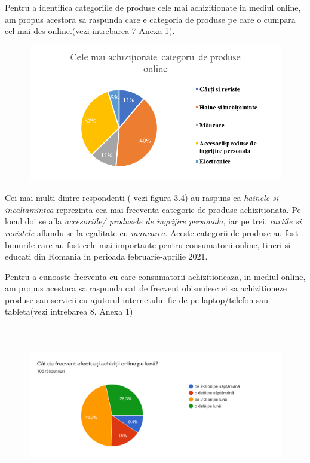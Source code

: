 \documentclass[a4paper, 12pt]{article}
\begin{document}
\begin{enumerate}[(A)]
		\quad Pentru a identifica categoriile de produse cele mai achizitionate in mediul online, am propus acestora sa raspunda care e categoria de produse pe care o cumpara cel mai des online.(vezi intrebarea 7 Anexa 1).
		
		\begin{figure}[!htb]
			\centering
			\includegraphics[width=13cm, height=6cm]{"figures/patru.png"}
		\end{figure}
	
		\quad Cei mai multi dintre respondenti ( vezi figura 3.4) au raspuns ca\textit{ hainele si incaltamintea} reprezinta cea mai frecventa categorie de produse achizitionata. Pe locul doi se afla \textit{accesoriile/ produsele de ingrijire personala}, iar pe trei,\textit{ cartile si revistele} aflandu-se la egalitate cu \textit{mancarea}. Aceste categorii de produse au fost bunurile care au fost cele mai importante pentru consumatorii online, tineri si educati din Romania in perioada februarie-aprilie 2021.
	
		\qquad Pentru a cunoaste frecventa  cu care consumatorii achizitioneaza, in mediul  online, am propus acestora sa raspunda cat de frecvent obisnuiesc ei sa achizitioneze produse sau servicii cu ajutorul internetului fie de pe laptop/telefon sau tableta(vezi intrebarea 8, Anexa 1)
	
		\begin{figure}[!htb]
			\centering
			\includegraphics[width=16cm, height=7cm]{"figures/cinci.png"}
		\end{figure}


\end{enumerate}
\end{document}
